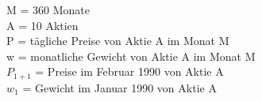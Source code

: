 \documentclass[12pt]{article}
\begin{document}
    \begin{multicols}{2}
        \begin{footnotesize}
            
            \noindent M = 360 Monate \\
            A = 10 Aktien \\
            P = tägliche Preise von Aktie A im Monat M \\
            w = monatliche Gewicht von Aktie A im Monat M \\
            $P_{1+1}$ = Preise im Februar 1990 von Aktie A \\
            $w_1$ = Gewicht im Januar 1990 von Aktie A 

        \end{footnotesize}
    \end{multicols}
\end{document}
